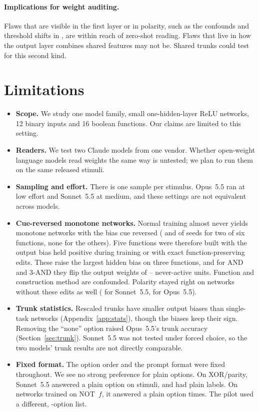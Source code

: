 \documentclass[10pt]{article}
\newcommand{\Sonnet}{Sonnet~5.5}
\newcommand{\Opus}{Opus~5.5}
\begin{document}
\paragraph{Implications for weight auditing.} Flaws that are visible in the first layer or in polarity, such as the confounds and threshold shifts in \citet{nusrat2026auditing}, are within reach of zero-shot reading. Flaws that live in how the output layer combines shared features may not be. Shared trunks could test for this second kind.

\section{Limitations}
\begin{itemize}
\item \textbf{Scope.} We study one model family, small one-hidden-layer ReLU networks, 12 binary inputs and 16 boolean functions. Our claims are limited to this setting.
\item \textbf{Readers.} We test two Claude models from one vendor. Whether open-weight language models read weights the same way is untested; we plan to run them on the same released stimuli.
\item \textbf{Sampling and effort.} There is one sample per stimulus. \Opus{} ran at low effort and \Sonnet{} at medium, and these settings are not equivalent across models.
\item \textbf{Cue-reversed monotone networks.} Normal training almost never yields monotone networks with the bias cue reversed (\nRFiveHitsD{} and \nRFiveHitsK{} of \nRFiveSearchN{} seeds for two of six functions, none for the others). Five functions were therefore built with the output bias held positive during training or with exact function-preserving edits. These raise the largest hidden bias on three functions, and for AND and 3-AND they flip the output weights of \nRFiveFlipsLo--\nRFiveFlipsHi{} never-active units. Function and construction method are confounded. Polarity stayed right on networks without these edits as well (\nRFiveSonNoShiftPol{} for \Sonnet, \nRFiveOpusNoShiftPol{} for \Opus).
\item \textbf{Trunk statistics.} Rescaled trunks have smaller output biases than single-task networks (Appendix~\ref{app:stats}), though the biases keep their sign. Removing the ``none'' option raised \Opus's trunk accuracy (Section~\ref{sec:trunk}). \Sonnet{} was not tested under forced choice, so the two models' trunk results are not directly comparable.
\item \textbf{Fixed format.} The option order and the prompt format were fixed throughout. We see no strong preference for plain options. On XOR/parity, \Sonnet{} answered a plain option on \nSonXLAnsPlain{} stimuli, and \nSonXLLabPlain{} had plain labels. On networks trained on NOT~$f$, it answered a plain option \nNativePlain{} times. The pilot used a different, \nPilotOptions-option list.

\end{itemize}
\end{document}
